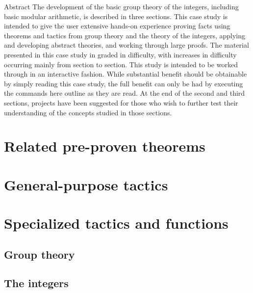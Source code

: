 \begin{titlepage}
\begin{inset}{Abstract}
The development of the basic group theory of the integers, including
basic modular arithmetic, is described in three sections.  This case
study is intended to give the user extensive hands-on experience proving
facts using theorems and tactics from group theory and the theory of
the integers, applying and developing abstract theories, and working
through large proofs.  The material presented in this case study in
graded in difficulty, with increases in difficulty occurring mainly
from section to section.  This study is intended to be worked through
in an interactive fashion.  While substantial benefit should be obtainable
by simply reading this case study, the full benefit can only be had
by executing the commands here outline as they are read.  At the end
of the second and third sections, projects have been suggested for those
who wish to further test their understanding of the concepts studied
in those sections.
\end{inset}

\thispagestyle{empty}

\end{titlepage}

\newpage
\tableofcontents 
{}
\newpage

\newcommand{\mvdots}{\vspace*{-12pt}\hspace*{2cm}\vdots\vspace*{-12pt}}
\newcommand{\evdots}{\vspace*{-12pt}\hspace*{2cm}\vdots}









\appendix

\section{Related pre-proven theorems}


\section{General-purpose tactics}


\section{Specialized tactics and functions}
\subsection{Group theory}


\subsection{The integers}



